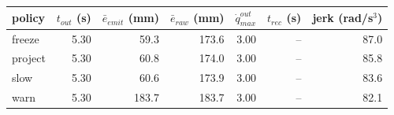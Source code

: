 \begin{tabular}{lrrrrrr}
\toprule
policy & $t_{out}$ (s) & $\bar{e}_{emit}$ (mm) & $\bar{e}_{raw}$ (mm) & $\dot{q}_{max}^{out}$ & $t_{rec}$ (s) & jerk (rad/s$^3$) \\
\midrule
freeze & 5.30 & 59.3 & 173.6 & 3.00 & -- & 87.0 \\
project & 5.30 & 60.8 & 174.0 & 3.00 & -- & 85.8 \\
slow & 5.30 & 60.6 & 173.9 & 3.00 & -- & 83.6 \\
warn & 5.30 & 183.7 & 183.7 & 3.00 & -- & 82.1 \\
\bottomrule
\end{tabular}
